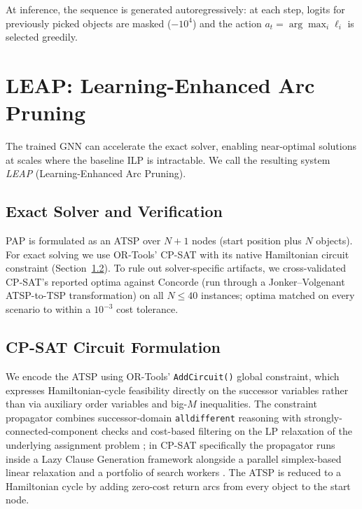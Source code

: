 \documentclass[conference]{IEEEtran}
\begin{document}
At inference, the sequence is generated autoregressively: at each step, logits for previously picked objects are masked ($-10^4$) and the action $a_t = \arg\max_i \ell_i$ is selected greedily.

\section{LEAP: Learning-Enhanced Arc Pruning}\label{sec:ilp_accel}

The trained GNN can accelerate the exact solver, enabling near-optimal solutions at scales where the baseline ILP is intractable. We call the resulting system \emph{LEAP} (Learning-Enhanced Arc Pruning).

\subsection{Exact Solver and Verification}

PAP is formulated as an ATSP over $N{+}1$ nodes (start position plus $N$ objects). For exact solving we use OR-Tools' CP-SAT \cite{ortools} with its native Hamiltonian circuit constraint (Section~\ref{sec:circuit}). To rule out solver-specific artifacts, we cross-validated CP-SAT's reported optima against Concorde \cite{applegate2006concorde} (run through a Jonker--Volgenant ATSP-to-TSP transformation) on all $N\!\le\!40$ instances; optima matched on every scenario to within a $10^{-3}$ cost tolerance.

\subsection{CP-SAT Circuit Formulation}\label{sec:circuit}

We encode the ATSP using OR-Tools' \texttt{AddCircuit()} global constraint, which expresses Hamiltonian-cycle feasibility directly on the successor variables rather than via auxiliary order variables and big-$M$ inequalities. The constraint propagator combines successor-domain \texttt{alldifferent} reasoning with strongly-connected-component checks and cost-based filtering on the LP relaxation of the underlying assignment problem \cite{caseau1997circuit,francis2014explaining}; in CP-SAT specifically the propagator runs inside a Lazy Clause Generation framework alongside a parallel simplex-based linear relaxation and a portfolio of search workers \cite{perron2023cpsat}. The ATSP is reduced to a Hamiltonian cycle by adding zero-cost return arcs from every object to the start node.
\end{document}
